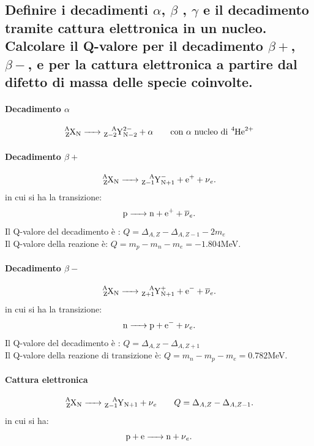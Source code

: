 \subsection[]{ Definire i decadimenti $\alpha$, $\beta$ , $\gamma$ e il decadimento tramite cattura elettronica in un nucleo. Calcolare il Q-valore per il decadimento $\beta+$, $\beta-$, e per la cattura elettronica a partire dal difetto di massa delle specie coinvolte.}
\paragraph{Decadimento $\alpha$}
\[
	\ce{ \ce{^{A}_{Z}X_{N}} -> \ce{^{A}_{Z-2}Y^{2-}_{N-2} + \alpha}} \quad \quad \text{con $\alpha$ nucleo di  \ce{^{4}_{}He^{2+}_{}}}
\]
\paragraph{Decadimento $\beta+$}
\[
	\ce{\ce{^{A}_{Z}X_{N}} -> \ce{^{A}_{Z-1}Y^{-}_{N+1}} + e^{+} + \nu_{e} }
.\]
in cui si ha la transizione:
\[
	\ce{p -> n + e^+ + \overline{\nu}_e}
.\]
Il Q-valore del decadimento è : $Q = \Delta_{A,Z} - \Delta_{A, Z-1} - 2m_e $\\
Il Q-valore della reazione è: $ Q = m_p - m_n - m_e = - 1.804 $MeV.

\paragraph{Decadimento $\beta-$}
\[
	\ce{\ce{^{A}_{Z}X_{N}} -> \ce{^{A}_{Z+1}Y^{+}_{N+1}} + e^{-} + \overline{\nu}_{e} }
.\]
in cui si ha la transizione:
\[
	\ce{n -> p + e^- + \nu_e}
.\]
Il Q-valore del decadimento è : $Q = \Delta_{A,Z} - \Delta_{A, Z+1} $\\
Il Q-valore della reazione di transizione è: $ Q = m_n - m_p - m_e = 0.782 $MeV.
\paragraph{Cattura elettronica}
\[
	\ce{\ce{^{A}_{Z}X_{N}} -> \ce{^{A}_{Z-1}Y_{N+1}} + \nu_e} \quad \quad Q = \Delta_{A,Z} - \Delta_{A, Z-1} 
.\] 
in cui si ha:
\[
\ce{p + e ->n + \nu_e }
.\] 

